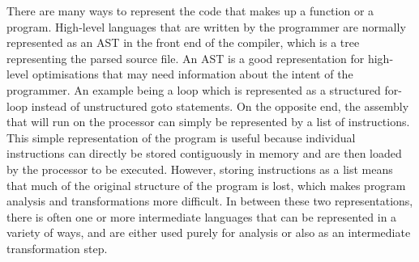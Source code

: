 There are many ways to represent the code that makes up a function or a program.
High-level languages that are written by the programmer are normally represented
as an \gls{AST} in the front end of the compiler, which is a tree representing
the parsed source file.  An \gls{AST} is a good representation for high-level
optimisations that may need information about the intent of the programmer. An
example being a loop which is represented as a structured for-loop instead of
unstructured goto statements.  On the opposite end, the assembly that will run
on the processor can simply be represented by a list of instructions.  This
simple representation of the program is useful because individual instructions
can directly be stored contiguously in memory and are then loaded by the
processor to be executed.  However, storing instructions as a list means that
much of the original structure of the program is lost, which makes program
analysis and transformations more difficult.  In between these two
representations, there is often one or more intermediate languages that can be
represented in a variety of ways, and are either used purely for analysis or
also as an intermediate transformation step.



